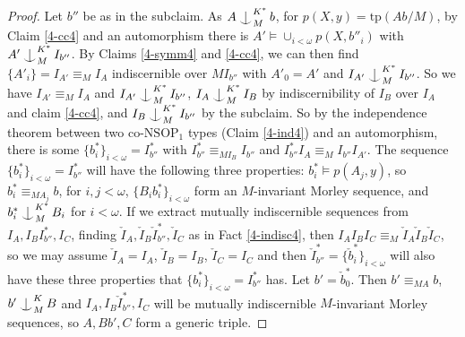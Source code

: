 \documentclass[10pt,a4paper]{amsart}
\def\Ind#1#2{#1\setbox0=\hbox{$#1x$}\kern\wd0\hbox to 0pt{\hss$#1\mid$\hss}
\lower.9\ht0\hbox to 0pt{\hss$#1\smile$\hss}\kern\wd0}
\def\ind{\mathop{\mathpalette\Ind{}}}
\begin{document}
\begin{proof}
    Let $b''$ be as in the subclaim. As $A \ind^{K^{*}}_{M} b$, for $p(X, y) = \mathrm{tp}(Ab/ M)$, by Claim \ref{4-cc4} and an automorphism there is $A' \models \cup_{i < \omega} p(X, b''_{i})$ with $A' \ind^{K^{*}}_{M} I_{b''}$. By Claims \ref{4-symm4} and \ref{4-cc4}, we can then find $\{A'_{i}\}=I_{A'} \equiv_{M} I_{A}$ indiscernible over $MI_{b''}$ with $A'_{0}=A'$ and $I_{A'} \ind^{K^{*}}_{M} I_{b''}$. So we have $I_{A'} \equiv_{M} I_{A}$ and $I_{A'} \ind^{K^{*}}_{M} I_{b''}$, $I_{A} \ind^{K^{*}}_{M} I_{B}$ by indiscernibility of $I_{B}$ over $I_{A}$ and claim \ref{4-cc4}, and $I_{B} \ind^{K^{*}}_{M} I_{b''}$ by the subclaim. So by the independence theorem between two co-$\mathrm{NSOP}_{1}$ types (Claim \ref{4-ind4}) and an automorphism, there is some $\{b^{*}_{i}\}_{i < \omega}=I^{*}_{b''}$ with $ I^{*}_{b''} \equiv_{MI_{B}} I_{b''}$ and $I^{*}_{b''} I_{A} \equiv_{M} I_{b''} I_{A'}$. The sequence $\{b^{*}_{i}\}_{i < \omega}=I^{*}_{b''}$ will have the following three properties: $b^{*}_{i} \models p(A_{j}, y)$, so $b^{*}_{i} \equiv_{MA_{j}} b$, for $i, j < \omega$, $\{B_{i}b^{*}_{i}\}_{i < \omega}$ form an $M$-invariant Morley sequence, and $b^{*}_{i} \ind_{M}^{K^{*}} B_{i}$ for $i < \omega$. If we extract mutually indiscernible  sequences from $I_{A}, I_{B}I^{*}_{b''}, I_{C}$, finding $\check{I}_{A}, \check{I}_{B}\check{I}^{*}_{b''}, \check{I}_{C}$ as in Fact \ref{4-indisc4}, then $I_{A} I_{B} I_{C} \equiv_{M} \check{I}_{A} \check{I}_{B} \check{I}_{C}$, so we may assume $\check{I}_{A} = I_{A}$, $\check{I}_{B} = I_{B}$, $\check{I}_{C} = I_{C}$ and then $\check{I}^{*}_{b''}=\{\check{b}_{i}^{*}\}_{i < \omega}$ will also have these three properties that $\{b^{*}_{i}\}_{i < \omega}=I^{*}_{b''}$ has. Let $b' =\check{b}_{0}^{*}$. Then $b'  \equiv_{MA} b$, $b' \ind_{M}^{K} B$ and $I_{A}, I_{B}\check{I}^{*}_{b''}, I_{C}$ will be mutually indiscernible $M$-invariant Morley sequences, so $A, Bb', C$ form a generic triple.  
\end{proof}
\end{document}
